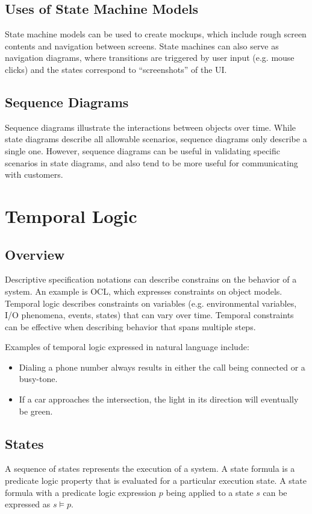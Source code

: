 \documentclass[12pt,titlepage]{article}
\let\stdsection\section
\renewcommand\section{\clearpage\stdsection}
\begin{document}
    \subsection{Uses of State Machine Models}
      State machine models can be used to create mockups, which include rough screen contents and navigation between screens. State machines can also
      serve as navigation diagrams, where transitions are triggered by user input (e.g. mouse clicks) and the states correspond to ``screenshots'' of
      the UI.

    \subsection{Sequence Diagrams}
      Sequence diagrams illustrate the interactions between objects over time. While state diagrams describe all allowable scenarios, sequence diagrams
      only describe a single one. However, sequence diagrams can be useful in validating specific scenarios in state diagrams, and also tend to be more
      useful for communicating with customers.

  \section{Temporal Logic}

    \subsection{Overview}
      Descriptive specification notations can describe constrains on the behavior of a system. An example is OCL, which expresses constraints on object models.
      Temporal logic describes constraints on variables (e.g. environmental variables, I/O phenomena, events, states) that can vary over time. Temporal
      constraints can be effective when describing behavior that spans multiple steps.

      Examples of temporal logic expressed in natural language include:
      \begin{itemize}
        \item Dialing a phone number always results in either the call being connected or a busy-tone.
        \item If a car approaches the intersection, the light in its direction will eventually be green.
      \end{itemize}

    \subsection{States}
      A sequence of states represents the execution of a system. A state formula is a predicate logic property that is evaluated for a particular execution state.
      A state formula with a predicate logic expression $p$ being applied to a state $s$ can be expressed as $s \vDash p$.
\end{document}
